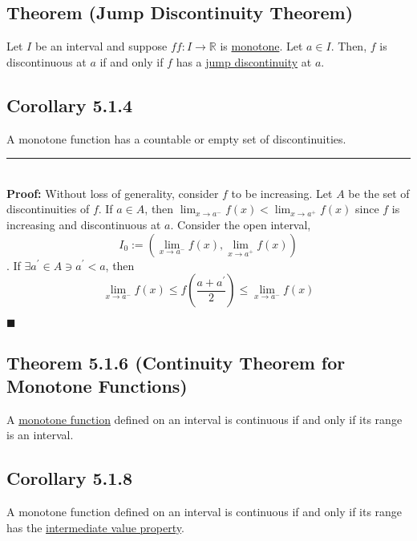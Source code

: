 \documentclass[11pt]{book}
\newcommand{\R}{\mathbb{R}}
\newcommand{\horline}{\noindent\rule{14.25cm}{0.6pt}\\}
\newcommand{\QED}{\begin{flushright}$\blacksquare$\end{flushright}}
\begin{document}
	\subsection{Theorem (Jump Discontinuity Theorem)}
	\label{subsec:JDT}
		\begin{theor}
			Let $I$ be an interval and suppose $ff: I \to \R$ is \hyperref[subsec:monotone]{monotone}. Let $a \in I$. Then, $f$ is discontinuous at $a$ if and only
			if $f$ has a \hyperref[subsec:jumpdiscontinuity]{jump discontinuity} at $a$.
		\end{theor}

	\subsection{Corollary 5.1.4}
	\label{subsec:cor514}
		\begin{cor}
			A monotone function has a countable or empty set of discontinuities.\hfill\break
			\horline
			\textbf{Proof:} Without loss of generality, consider $f$ to be increasing. Let $A$ be the set of discontinuities of $f$. If $a \in A$, then $\displaystyle\lim_{x \to a^{-}}{f(x) < \displaystyle\lim_{x \to a^+}{f(x)}}$ since $f$ is increasing and discontinuous at $a$. Consider the open interval,
			$$I_0 := (\displaystyle\lim_{x \to a^-}{f(x)},\displaystyle\lim_{x \to a^+}{f(x)})$$. If $\exists a^{\prime} \in A \ni a^{\prime} < a$, then
			$$\displaystyle\lim_{x \to a^-}{f(x)} \leq f(\frac{a+a^{\prime}}{2}) \leq \displaystyle\lim_{x \to a^-}{f(x)}$$\QED
		\end{cor}

	\subsection{Theorem 5.1.6 (Continuity Theorem for Monotone Functions)}
	\label{subsec:theor516}
		\begin{theor}
			A \hyperref[subsec:monotone]{monotone function} defined on an interval is continuous if and only if its range is an interval.
		\end{theor}

	\newpage		
	\subsection{Corollary 5.1.8}
	\label{subsec:cor518}
		\begin{cor}
			A monotone function defined on an interval is continuous if and only if its range has the \hyperref[subsec:intermediatevalueproperty]{intermediate value property}.
		\end{cor}
\end{document}
